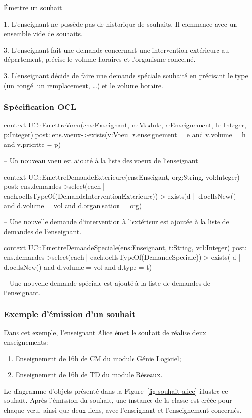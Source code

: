 \begin{ocl}
\begin{usecase}{\'Emettre un souhait}
\begin{variation}
	\item [1.] L'enseignant ne possède pas de historique de souhaits. Il commence avec un ensemble vide de souhaits.
	\item [3.] L'enseignant fait une demande concernant une intervention extérieure au département, précise le volume horaires et l'organisme concerné.
	\item [3.] L'enseignant décide de faire une demande spéciale souhaité en précisant le type (un congé, un remplacement, \dots) et le volume horaire.
\end{variation}
\end{usecase}

\subsubsection{Spécification OCL}
\begin{ocl}
context UC::EmettreVoeu(ens:Enseignant, m:Module, e:Enseignement, h: Integer, p:Integer)
post: 
ens.voeux->exists(v:Voeu| v.enseignement = e and v.volume = h and v.priorite = p)

-- Un nouveau voeu est ajouté à la liste des voeux de l`enseignant
\end{ocl}

\begin{ocl}
context UC::EmettreDemandeExterieure(ens:Enseigant, org:String, vol:Integer)
post: 
	ens.demandes->select(each | each.oclIsTypeOf(DemandeInterventionExterieure))->
		exists(d | d.oclIsNew() and d.volume = vol and d.organisation = org)
		
-- Une nouvelle demande d`intervention à l`extérieur est ajoutée à la liste de demandes de l`enseignant.
\end{ocl}

\begin{ocl}
context UC::EmettreDemandeSpeciale(ens:Enseignant, t:String, vol:Integer)
post:
	ens.demandes->select(each | each.oclIsTypeOf(DemandeSpeciale))->
		exists( d | d.oclIsNew() and d.volume = vol and d.type = t)

-- Une nouvelle demande spéciale est ajouté à la liste de demandes de l`enseignant.
\end{ocl}


\subsubsection{Exemple d'émission d'un souhait}
Dans cet exemple, l'enseignant Alice émet le souhait de réalise deux enseignements:
\begin{enumerate}
	\item Enseignement de 16h de CM du module Génie Logiciel;
	\item Enseignement de 16h de TD du module Réseaux.
\end{enumerate}
Le diagramme d'objets présenté dans la Figure~\ref{fig:souhait-alice} illustre ce souhait.
Après l'émission du souhait, une instance de la classe  est créée pour chaque vœu, ainsi que deux liens, avec l'enseignant et l'enseignement concernés. 


\end{ocl}
